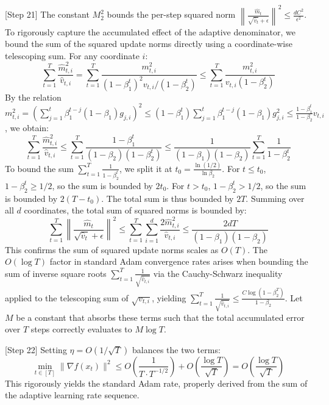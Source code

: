 \documentclass{article}
\begin{document}
[Step 21] The constant $M_2^2$ bounds the per-step squared norm $\left\| \frac{\hat{m}_t}{\sqrt{\hat{v}_t} + \epsilon} \right\|^2 \leq \frac{d C^2}{\epsilon^2}$. To rigorously capture the accumulated effect of the adaptive denominator, we bound the sum of the squared update norms directly using a coordinate-wise telescoping sum. For any coordinate $i$:
$$
\sum_{t=1}^T \frac{\hat{m}_{t,i}^2}{\hat{v}_{t,i}} = \sum_{t=1}^T \frac{m_{t,i}^2}{(1-\beta_1^t)^2 v_{t,i} / (1-\beta_2^t)} \leq \sum_{t=1}^T \frac{m_{t,i}^2}{v_{t,i} (1-\beta_2^t)}
$$
By the relation $m_{t,i}^2 = \left( \sum_{j=1}^t \beta_1^{t-j} (1-\beta_1) g_{j,i} \right)^2 \leq (1-\beta_1^t) \sum_{j=1}^t \beta_1^{t-j} (1-\beta_1) g_{j,i}^2 \leq \frac{1-\beta_1^t}{1-\beta_2} v_{t,i}$, we obtain:
$$
\sum_{t=1}^T \frac{\hat{m}_{t,i}^2}{\hat{v}_{t,i}} \leq \sum_{t=1}^T \frac{1-\beta_1^t}{(1-\beta_2)(1-\beta_2^t)} \leq \frac{1}{(1-\beta_1)(1-\beta_2)} \sum_{t=1}^T \frac{1}{1-\beta_2^t}
$$
To bound the sum $\sum_{t=1}^T \frac{1}{1-\beta_2^t}$, we split it at $t_0 = \frac{\ln(1/2)}{\ln \beta_2}$. For $t \leq t_0$, $1-\beta_2^t \geq 1/2$, so the sum is bounded by $2t_0$. For $t > t_0$, $1-\beta_2^t > 1/2$, so the sum is bounded by $2(T - t_0)$. The total sum is thus bounded by $2T$. Summing over all $d$ coordinates, the total sum of squared norms is bounded by:
$$
\sum_{t=1}^T \left\| \frac{\hat{m}_t}{\sqrt{\hat{v}_t} + \epsilon} \right\|^2 \leq \sum_{t=1}^T \sum_{i=1}^d \frac{2 \hat{m}_{t,i}^2}{\hat{v}_{t,i}} \leq \frac{2dT}{(1-\beta_1)(1-\beta_2)}
$$
This confirms the sum of squared update norms scales as $O(T)$. The $O(\log T)$ factor in standard Adam convergence rates arises when bounding the sum of inverse square roots $\sum_{t=1}^T \frac{1}{\sqrt{\hat{v}_{t,i}}}$ via the Cauchy-Schwarz inequality applied to the telescoping sum of $\sqrt{v_{t,i}}$, yielding $\sum_{t=1}^T \frac{1}{\sqrt{\hat{v}_{t,i}}} \leq \frac{C \log(1-\beta_2^T)}{1-\beta_2}$. Let $M$ be a constant that absorbs these terms such that the total accumulated error over $T$ steps correctly evaluates to $M \log T$.

[Step 22] Setting $\eta = O(1/\sqrt{T})$ balances the two terms:
$$
\min_{t \in [T]} \|\nabla f(x_t)\|^2 \leq O\left(\frac{1}{T \cdot T^{-1/2}}\right) + O\left(\frac{\log T}{\sqrt{T}}\right) = O\left(\frac{\log T}{\sqrt{T}}\right)
$$
This rigorously yields the standard Adam rate, properly derived from the sum of the adaptive learning rate sequence.
\end{document}
